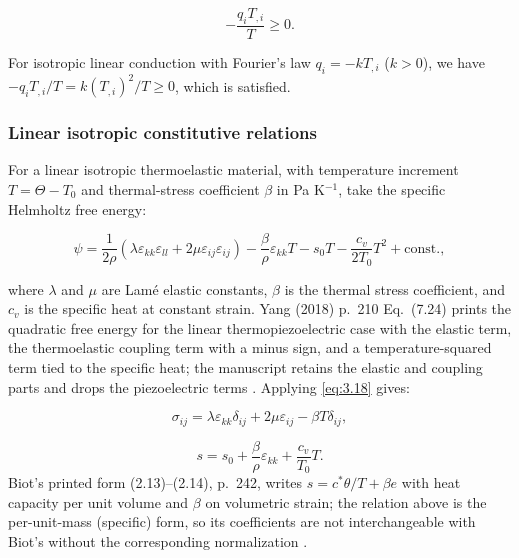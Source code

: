 \begin{equation}
-\frac{q_i T_{,i}}{T} \geq 0.
\label{eq:3.19}
\end{equation}

For isotropic linear conduction with Fourier's law $q_i = -k T_{,i}$ ($k > 0$), we have $-q_i T_{,i}/T = k(T_{,i})^2/T \geq 0$, which is satisfied.

\subsubsection{Linear isotropic constitutive relations}

For a linear isotropic thermoelastic material, with temperature increment $T=\Theta-T_0$ and thermal-stress coefficient $\beta$ in Pa K$^{-1}$, take the specific Helmholtz free energy:

\begin{equation}
\psi = \frac{1}{2\rho}(\lambda \varepsilon_{kk}\varepsilon_{ll} + 2\mu \varepsilon_{ij}\varepsilon_{ij})
- \frac{\beta}{\rho}\varepsilon_{kk} T - s_0 T - \frac{c_v}{2 T_0}T^2 + \text{const.},
\label{eq:3.20}
\end{equation}

where $\lambda$ and $\mu$ are Lamé elastic constants, $\beta$ is the thermal stress coefficient, and $c_v$ is the specific heat at constant strain. Yang (2018) p.~210 Eq.~(7.24) prints the quadratic free energy for the linear thermopiezoelectric case with the elastic term, the thermoelastic coupling term with a minus sign, and a temperature-squared term tied to the specific heat; the manuscript retains the elastic and coupling parts and drops the piezoelectric terms \cite{Yang2018}. Applying \eqref{eq:3.18} gives:

\begin{equation}
\sigma_{ij} = \lambda \varepsilon_{kk}\delta_{ij} + 2\mu\varepsilon_{ij} - \beta T\delta_{ij},
\label{eq:3.21}
\end{equation}

\begin{equation}
s = s_0 + \frac{\beta}{\rho}\varepsilon_{kk} + \frac{c_v}{T_0}T.
\label{eq:3.22}
\end{equation}
Biot's printed form (2.13)--(2.14), p.~242, writes $s=c^{*}\theta/T+\beta e$ with heat capacity per unit volume and $\beta$ on volumetric strain; the relation above is the per-unit-mass (specific) form, so its coefficients are not interchangeable with Biot's without the corresponding normalization \cite{Biot1956}.

